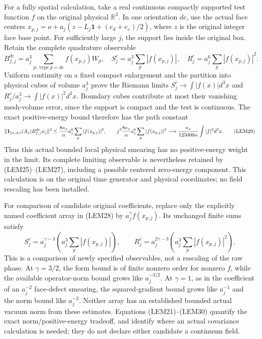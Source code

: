 \documentclass[11pt]{article}
\begin{document}
For a fully spatial calculation, take a real continuous compactly supported test function \(f\) on the original physical \(\mathbb R^3\). In one orientation \(de\), use the actual face centers
\(x_{p,j}=o+a_j(z-L_j\mathbf1+(e_d+e_e)/2)\), where \(z\) is the original integer face base point. For sufficiently large \(j\), the support lies inside the original box. Retain the complete quadrature observable
\[
 B_{f,j}^{de}=a_j^3\sum_{p:\operatorname{type}p=de}f(x_{p,j})W_p,
 \quad
 S_j^c=a_j^3\sum_p|f(x_{p,j})|,\quad
 R_j^c=a_j^6\sum_p|f(x_{p,j})|^2.
 \tag{LEM28}
\]
Uniform continuity on a fixed compact enlargement and the partition into physical cubes of volume \(a_j^3\) prove the Riemann limits
\(S_j^c\to\int|f(x)|d^3x\) and
\(R_j^c/a_j^3\to\int|f(x)|^2d^3x\). Boundary cubes contribute at most their vanishing mesh-volume error, since the support is compact and the test is continuous. The exact positive-energy bound therefore has the path constant
\[
 \|\mathbf1_{[\alpha,\infty)}(A_j)B_{f,j}^{de}\psi_j\|^2
 \le {8\kappa_*\over\alpha}a_j^6\sum_p|f(x_{p,j})|^2,
 \qquad
 j^3{8\kappa_*\over\alpha}a_j^6\sum_p|f(x_{p,j})|^2
 \longrightarrow{\kappa_*\over125000\alpha}\int|f|^2d^3x.
 \tag{LEM29}
\]
Thus this actual bounded local physical smearing has no positive-energy weight in the limit. Its complete limiting observable is nevertheless retained by (LEM25)–(LEM27), including a possible centered zero-energy component. This calculation is on the original time generator and physical coordinates; no field rescaling has been installed.

For comparison of candidate original coefficients, replace only the explicitly named coefficient array in (LEM28) by \(a_j^\gamma f(x_{p,j})\). Its unchanged finite sums satisfy
\[
 S_j^c=a_j^{\gamma-3}\left(a_j^3\sum_p|f(x_{p,j})|\right),\qquad
 R_j^c=a_j^{2\gamma-3}\left(a_j^3\sum_p|f(x_{p,j})|^2\right).
 \tag{LEM30}
\]
This is a comparison of newly specified observables, not a rescaling of the raw phase. At \(\gamma=3/2\), the form bound is of finite nonzero order for nonzero \(f\), while the available operator-norm bound grows like \(a_j^{-3/2}\). At \(\gamma=1\), as in the coefficient of an \(a_j^{-2}\) face-defect smearing, the squared-gradient bound grows like \(a_j^{-1}\) and the norm bound like \(a_j^{-2}\). Neither array has an established bounded actual vacuum norm from these estimates. Equations (LEM21)–(LEM30) quantify the exact norm/positive-energy tradeoff, and identify where an actual covariance calculation is needed; they do not declare either candidate a continuum field.
\end{document}
